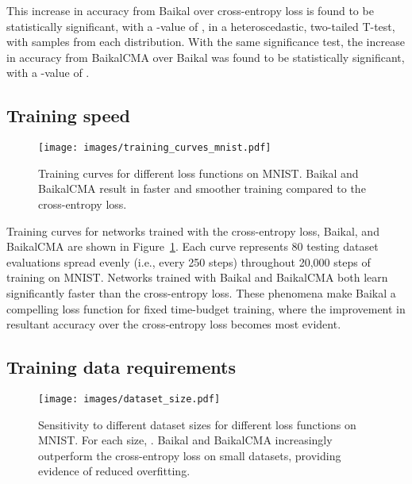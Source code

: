 \documentclass[conference]{IEEEtran}
\begin{document}
This increase in accuracy from Baikal over cross-entropy loss is found to be statistically significant, with a -value of , in a heteroscedastic, two-tailed T-test, with  samples from each distribution. With the same significance test, the increase in accuracy from BaikalCMA over Baikal was found to be statistically significant, with a -value of .
















\subsection{Training speed}

\begin{figure}
  \centering
  \texttt{[image: images/training\_curves\_mnist.pdf]}
  \caption{Training curves for different loss functions on MNIST. Baikal and BaikalCMA result in faster and smoother training compared to the cross-entropy loss.}
  \label{fig:training_curves}
\end{figure}

Training curves for networks trained with the cross-entropy loss, Baikal, and BaikalCMA are shown in Figure~\ref{fig:training_curves}. Each curve represents 80 testing dataset evaluations spread evenly (i.e., every 250 steps) throughout 20,000 steps of training on MNIST. Networks trained with Baikal and BaikalCMA both learn significantly faster than the cross-entropy loss. These phenomena make Baikal a compelling loss function for fixed time-budget training, where the improvement in resultant accuracy over the cross-entropy loss becomes most evident. 


\subsection{Training data requirements}
\label{sec:dataset_size}


\begin{figure}
  \centering
\texttt{[image: images/dataset\_size.pdf]}
  \caption{Sensitivity to different dataset sizes for different loss functions on MNIST. For each size, . Baikal and BaikalCMA increasingly outperform the cross-entropy loss on small datasets, providing evidence of reduced overfitting.}
  \label{fig:size_sensitivity}
\end{figure}
\end{document}
